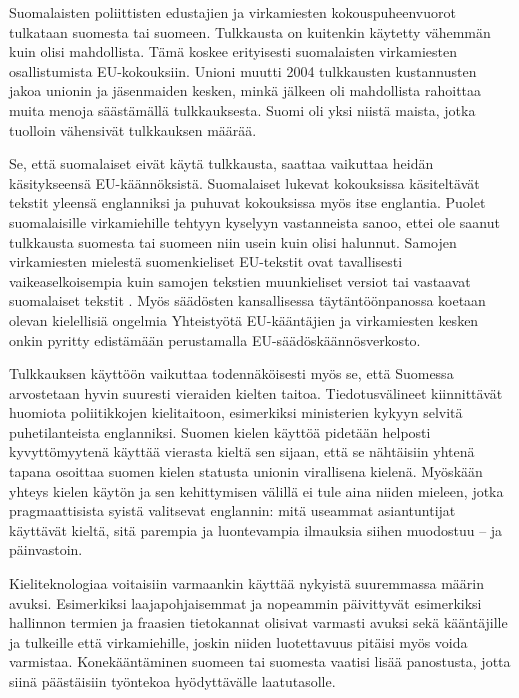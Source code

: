 \documentclass[]{../../metanetpaper}
\begin{document}
\begin{multicols}{2}
Suomalaisten poliittisten edustajien ja virkamiesten
kokouspuheenvuorot tulkataan suomesta tai suomeen. Tulkkausta on
kuitenkin käytetty vähemmän kuin olisi mahdollista. Tämä koskee
erityisesti suomalaisten virkamiesten osallistumista
EU-kokouksiin. Unioni muutti 2004 tulkkausten kustannusten jakoa
unionin ja jäsenmaiden kesken, minkä jälkeen oli mahdollista rahoittaa
muita menoja säästämällä tulkkauksesta. Suomi oli yksi niistä maista,
jotka tuolloin vähensivät tulkkauksen määrää.

Se, että suomalaiset eivät käytä tulkkausta, saattaa vaikuttaa heidän
käsitykseensä EU-käännöksistä. Suomalaiset lukevat kokouksissa
käsiteltävät tekstit yleensä englanniksi ja puhuvat kokouksissa myös
itse englantia. Puolet suomalaisille virkamiehille tehtyyn kyselyyn
vastanneista sanoo, ettei ole saanut tulkkausta suomesta tai suomeen
niin usein kuin olisi halunnut. Samojen virkamiesten mielestä
suomenkieliset EU-tekstit ovat tavallisesti vaikeaselkoisempia kuin
samojen tekstien muunkieliset versiot tai vastaavat suomalaiset
tekstit \cite{Piehl2008}. Myös säädösten kansallisessa
täytäntöönpanossa koetaan olevan kielellisiä ongelmia
\cite{OECD2010} Yhteistyötä EU-kääntäjien ja virkamiesten kesken
onkin pyritty edistämään perustamalla EU-säädöskäännösverkosto.

Tulkkauksen käyttöön vaikuttaa todennäköisesti myös se, että Suomessa
arvostetaan hyvin suuresti vieraiden kielten taitoa. Tiedotusvälineet
kiinnittävät huomiota poliitikkojen kielitaitoon, esimerkiksi
ministerien kykyyn selvitä puhetilanteista englanniksi. Suomen kielen
käyttöä pidetään helposti kyvyttömyytenä käyttää vierasta kieltä sen
sijaan, että se nähtäisiin yhtenä tapana osoittaa suomen kielen
statusta unionin virallisena kielenä.  Myöskään yhteys kielen käytön
ja sen kehittymisen välillä ei tule aina niiden mieleen, jotka
pragmaattisista syistä valitsevat englannin: mitä useammat
asiantuntijat käyttävät kieltä, sitä parempia ja luontevampia
ilmauksia siihen muodostuu – ja päinvastoin.

Kieliteknologiaa voitaisiin varmaankin käyttää nykyistä suuremmassa
määrin avuksi. Esimerkiksi laajapohjaisemmat ja nopeammin päivittyvät
esimerkiksi hallinnon termien ja fraasien tietokannat olisivat
varmasti avuksi sekä kääntäjille ja tulkeille että virkamiehille,
joskin niiden luotettavuus pitäisi myös voida varmistaa.
Konekääntäminen suomeen tai suomesta vaatisi lisää panostusta, jotta
siinä päästäisiin työntekoa hyödyttävälle laatutasolle.




\end{multicols}
\end{document}
